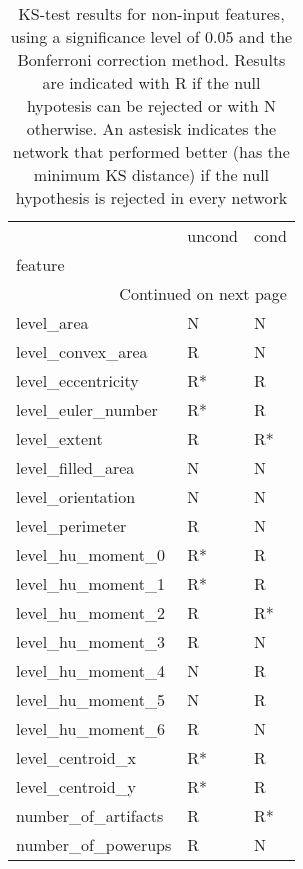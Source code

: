 \documentclass{report}
\begin{document}
\begin{longtable}{lll}
	\caption[Test results for non input features]{ \small KS-test results for non-input features, using a significance level of 0.05 and the Bonferroni correction method. Results are indicated with R if the null hypotesis can be rejected or with N otherwise. An astesisk indicates the network that performed better (has the minimum KS distance) if the null hypothesis is rejected in every network}\\
	\toprule
	{} & uncond & cond \\
	feature                       &        &      \\
	\midrule
	\endhead
	\midrule
	\multicolumn{3}{r}{{Continued on next page}} \\
	\midrule
	\endfoot
	
	\bottomrule
	\endlastfoot
	level\_area                    &      N &    N \\
	level\_convex\_area             &      R &    N \\
	level\_eccentricity            &     R* &    R \\
	level\_euler\_number            &     R* &    R \\
	level\_extent                  &      R &   R* \\
	level\_filled\_area             &      N &    N \\
	level\_orientation             &      N &    N \\
	level\_perimeter               &      R &    N \\
	level\_hu\_moment\_0             &     R* &    R \\
	level\_hu\_moment\_1             &     R* &    R \\
	level\_hu\_moment\_2             &      R &   R* \\
	level\_hu\_moment\_3             &      R &    N \\
	level\_hu\_moment\_4             &      N &    R \\
	level\_hu\_moment\_5             &      N &    R \\
	level\_hu\_moment\_6             &      R &    N \\
	level\_centroid\_x              &     R* &    R \\
	level\_centroid\_y              &     R* &    R \\
	number\_of\_artifacts           &      R &   R* \\
	number\_of\_powerups            &      R &    N \\

\end{longtable}
\end{document}
